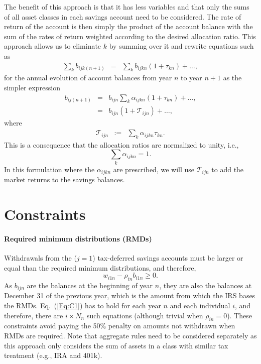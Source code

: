 \documentclass{report}[fleqn,12pt]
\begin{document}
The benefit of this approach is that it has less variables and that only the sums of
all asset classes in each savings account need to be considered. The rate of return
of the account is then simply the product of the account balance with the sum of
the rates of return weighted according to the desired allocation ratio.
This approach allows us to eliminate $k$ by summing over it and rewrite
equations such as
\begin{eqnarray}
	\sum_k b_{ijk(n+1)} &=& \sum_k b_{ijkn} (1 + \tau_{kn}) + \ldots,
\end{eqnarray}
for the annual evolution of account balances from year $n$ to year $n+1$
as the simpler expression 
\begin{eqnarray}
	b_{ij(n+1)} &=& b_{ijn} \sum_k \alpha_{ijkn} (1 + \tau_{kn}) + \ldots ,\nonumber \\
		  &=& b_{ijn} (1 + \mathcal{T}_{ijn}) + \ldots ,
\end{eqnarray}
where
\begin{eqnarray}
	\label{Eq:Tau1}
	\mathcal{T}_{ijn} &:=& \sum_k \alpha_{ijkn} \tau_{kn}.
\end{eqnarray}
This is a consequence that the allocation ratios are normalized to unity, i.e.,
\begin{equation}
	\sum_k \alpha_{ijkn} = 1.
\end{equation}
In this formulation where the $\alpha_{ijkn}$ are prescribed,
we will use $\mathcal{T}_{ijn}$ to
add the market returns to the savings balances.

\section{Constraints}
\paragraph*{Required minimum distributions (RMDs)}
	Withdrawals from the ($j=1$) tax-deferred savings accounts must be larger
	or equal than the required minimum distributions, and therefore,
	\begin{equation}
		\label{Eq:C1}
		w_{i1n} -  \rho_{in}b_{i1n} \geq 0.
	\end{equation}
	As $b_{ijn}$ are the balances at the beginning of year $n$, they are also the balances
	at December 31 of the previous year, which is the amount from which the IRS bases the RMDs.
	Eq.~(\ref{Eq:C1}) has to hold for each year $n$ and each individual $i$, and therefore, there
	are $i\times N_n$ such equations (although trivial when $\rho_{in} = 0$).
	These constraints avoid paying the 50\% penalty
	on amounts not withdrawn when RMDs are required.
	Note that aggregate rules need to be considered separately as this approach only considers
	the sum of assets in a class with similar tax treatment (e.g., IRA and 401k).
\end{document}
